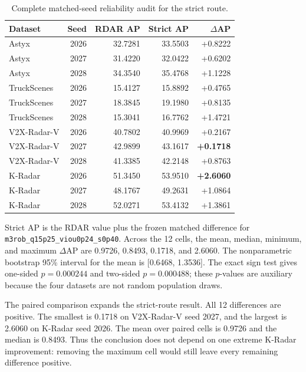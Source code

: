 \documentclass[preprint,12pt,times]{elsarticle}
\newcommand{\reviewcaption}[1]{\caption{\textcolor{floatreviewblue}{#1}}}
\newcommand{\reviewcaption}[1]{\caption{#1}}
\begin{document}
\begin{table}[!t]
\centering
\reviewcaption{Complete matched-seed reliability audit for the strict route.}
\label{tab:paired-results}
\begingroup
\color{black}
\scriptsize
\setlength{\tabcolsep}{3pt}
\renewcommand{\arraystretch}{1.14}
\begin{tabularx}{\columnwidth}{@{}Xrrrr@{}}
\toprule
Dataset & Seed & RDAR AP & Strict AP & $\Delta$AP \\
\midrule
Astyx & 2026 & 32.7281 & 33.5503 & +0.8222 \\
Astyx & 2027 & 31.4220 & 32.0422 & +0.6202 \\
Astyx & 2028 & 34.3540 & 35.4768 & +1.1228 \\
\addlinespace
TruckScenes & 2026 & 15.4127 & 15.8892 & +0.4765 \\
TruckScenes & 2027 & 18.3845 & 19.1980 & +0.8135 \\
TruckScenes & 2028 & 15.3041 & 16.7762 & +1.4721 \\
\addlinespace
V2X-Radar-V & 2026 & 40.7802 & 40.9969 & +0.2167 \\
V2X-Radar-V & 2027 & 42.9899 & 43.1617 & \textbf{+0.1718} \\
V2X-Radar-V & 2028 & 41.3385 & 42.2148 & +0.8763 \\
\addlinespace
K-Radar & 2026 & 51.3450 & 53.9510 & \textbf{+2.6060} \\
K-Radar & 2027 & 48.1767 & 49.2631 & +1.0864 \\
K-Radar & 2028 & 52.0271 & 53.4132 & +1.3861 \\
\bottomrule
\end{tabularx}
\endgroup
\vspace{2pt}
\parbox{\columnwidth}{\scriptsize
Strict AP is the RDAR value plus the frozen matched difference for
\texttt{m3rob\_q15p25\_viou0p24\_s0p40}. Across the 12 cells, the mean,
median, minimum, and maximum $\Delta$AP are 0.9726, 0.8493, 0.1718, and
2.6060. The nonparametric bootstrap 95\% interval for the mean is
[0.6468, 1.3536]. The exact sign test gives one-sided
$p=0.000244$ and two-sided $p=0.000488$; these $p$-values are auxiliary
because the four datasets are not random population draws.}
\end{table}

The paired comparison expands the strict-route result. All 12 differences are
positive. The smallest is 0.1718
on V2X-Radar-V seed 2027, and the largest is 2.6060 on K-Radar seed 2026. The
mean over paired cells is 0.9726 and the median is 0.8493. Thus the conclusion
does not depend on one extreme K-Radar improvement: removing the maximum cell
would still leave every remaining difference positive.
\end{document}
